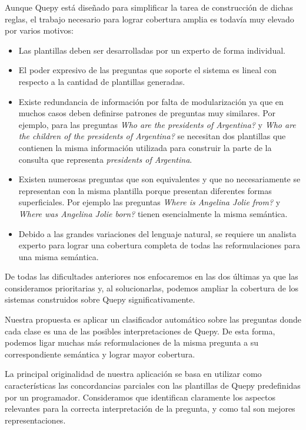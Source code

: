 Aunque Quepy está diseñado para simplificar la tarea de construcción de dichas reglas, el trabajo necesario para lograr cobertura amplia es todavía muy elevado por varios motivos:
\begin{itemize}
    \item Las plantillas deben ser desarrolladas por un experto de forma individual.
    \item El poder expresivo de las preguntas que soporte el sistema es lineal con respecto a la cantidad de plantillas generadas.
    \item Existe redundancia de información por falta de modularización ya que en muchos casos deben definirse patrones de preguntas muy similares. Por ejemplo, para las preguntas \textit{Who are the presidents of Argentina?} y \textit{Who are the children of the presidents of Argentina?} se necesitan dos plantillas que contienen la misma información utilizada para construir la parte de la consulta que representa \textit{presidents of Argentina}.
    \item Existen numerosas preguntas que son equivalentes y que no necesariamente se representan con la misma plantilla porque presentan diferentes formas superficiales. Por ejemplo las preguntas \textit{Where is Angelina Jolie from?} y \textit{Where was Angelina Jolie born?} tienen esencialmente la misma semántica.
    \item Debido a las grandes variaciones del lenguaje natural, se requiere un analista experto para lograr una cobertura completa de todas las reformulaciones para una misma semántica.
\end{itemize}

De todas las dificultades anteriores nos enfocaremos en las dos últimas ya que las consideramos prioritarias y, al solucionarlas, podemos ampliar la cobertura de los sistemas construidos sobre Quepy significativamente.

Nuestra propuesta es aplicar un clasificador automático sobre las preguntas donde cada clase es una de las posibles interpretaciones de Quepy. De esta forma, podemos ligar muchas más reformulaciones de la misma pregunta a su correspondiente semántica y lograr mayor cobertura.

La principal originalidad de nuestra aplicación se basa en utilizar como características las concordancias parciales con las plantillas de Quepy predefinidas por un programador. Consideramos que identifican claramente los aspectos relevantes para la correcta interpretación de la pregunta, y como tal son mejores representaciones.

